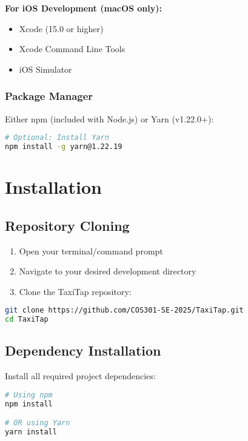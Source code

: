 \documentclass[11pt,a4paper]{article}
\begin{document}
\textbf{For iOS Development (macOS only):}
\begin{itemize}
    \item Xcode (15.0 or higher)
    \item Xcode Command Line Tools
    \item iOS Simulator
\end{itemize}

\subsubsection{Package Manager}

Either npm (included with Node.js) or Yarn (v1.22.0+):

\begin{lstlisting}[language=bash]
# Optional: Install Yarn
npm install -g yarn@1.22.19
\end{lstlisting}

\section{Installation}

\subsection{Repository Cloning}

\begin{enumerate}
    \item Open your terminal/command prompt
    \item Navigate to your desired development directory
    \item Clone the TaxiTap repository:
\end{enumerate}

\begin{lstlisting}[language=bash]
git clone https://github.com/COS301-SE-2025/TaxiTap.git
cd TaxiTap
\end{lstlisting}

\subsection{Dependency Installation}

Install all required project dependencies:

\begin{lstlisting}[language=bash]
# Using npm
npm install

# OR using Yarn
yarn install
\end{lstlisting}
\end{document}
